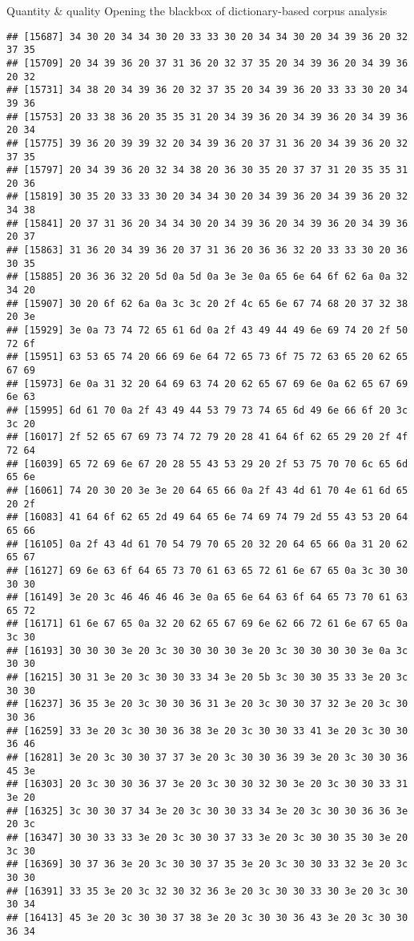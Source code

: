 \documentclass[
  ignorenonframetext,
]{beamer}
\begin{document}
\begin{frame}[fragile]{Quantity \& quality \textbar{} Opening the
blackbox of dictionary-based corpus analysis}
\begin{verbatim}
## [15687] 34 30 20 34 34 30 20 33 33 30 20 34 34 30 20 34 39 36 20 32 37 35
## [15709] 20 34 39 36 20 37 31 36 20 32 37 35 20 34 39 36 20 34 39 36 20 32
## [15731] 34 38 20 34 39 36 20 32 37 35 20 34 39 36 20 33 33 30 20 34 39 36
## [15753] 20 33 38 36 20 35 35 31 20 34 39 36 20 34 39 36 20 34 39 36 20 34
## [15775] 39 36 20 39 39 32 20 34 39 36 20 37 31 36 20 34 39 36 20 32 37 35
## [15797] 20 34 39 36 20 32 34 38 20 36 30 35 20 37 37 31 20 35 35 31 20 36
## [15819] 30 35 20 33 33 30 20 34 34 30 20 34 39 36 20 34 39 36 20 32 34 38
## [15841] 20 37 31 36 20 34 34 30 20 34 39 36 20 34 39 36 20 34 39 36 20 37
## [15863] 31 36 20 34 39 36 20 37 31 36 20 36 36 32 20 33 33 30 20 36 30 35
## [15885] 20 36 36 32 20 5d 0a 5d 0a 3e 3e 0a 65 6e 64 6f 62 6a 0a 32 34 20
## [15907] 30 20 6f 62 6a 0a 3c 3c 20 2f 4c 65 6e 67 74 68 20 37 32 38 20 3e
## [15929] 3e 0a 73 74 72 65 61 6d 0a 2f 43 49 44 49 6e 69 74 20 2f 50 72 6f
## [15951] 63 53 65 74 20 66 69 6e 64 72 65 73 6f 75 72 63 65 20 62 65 67 69
## [15973] 6e 0a 31 32 20 64 69 63 74 20 62 65 67 69 6e 0a 62 65 67 69 6e 63
## [15995] 6d 61 70 0a 2f 43 49 44 53 79 73 74 65 6d 49 6e 66 6f 20 3c 3c 20
## [16017] 2f 52 65 67 69 73 74 72 79 20 28 41 64 6f 62 65 29 20 2f 4f 72 64
## [16039] 65 72 69 6e 67 20 28 55 43 53 29 20 2f 53 75 70 70 6c 65 6d 65 6e
## [16061] 74 20 30 20 3e 3e 20 64 65 66 0a 2f 43 4d 61 70 4e 61 6d 65 20 2f
## [16083] 41 64 6f 62 65 2d 49 64 65 6e 74 69 74 79 2d 55 43 53 20 64 65 66
## [16105] 0a 2f 43 4d 61 70 54 79 70 65 20 32 20 64 65 66 0a 31 20 62 65 67
## [16127] 69 6e 63 6f 64 65 73 70 61 63 65 72 61 6e 67 65 0a 3c 30 30 30 30
## [16149] 3e 20 3c 46 46 46 46 3e 0a 65 6e 64 63 6f 64 65 73 70 61 63 65 72
## [16171] 61 6e 67 65 0a 32 20 62 65 67 69 6e 62 66 72 61 6e 67 65 0a 3c 30
## [16193] 30 30 30 3e 20 3c 30 30 30 30 3e 20 3c 30 30 30 30 3e 0a 3c 30 30
## [16215] 30 31 3e 20 3c 30 30 33 34 3e 20 5b 3c 30 30 35 33 3e 20 3c 30 30
## [16237] 36 35 3e 20 3c 30 30 36 31 3e 20 3c 30 30 37 32 3e 20 3c 30 30 36
## [16259] 33 3e 20 3c 30 30 36 38 3e 20 3c 30 30 33 41 3e 20 3c 30 30 36 46
## [16281] 3e 20 3c 30 30 37 37 3e 20 3c 30 30 36 39 3e 20 3c 30 30 36 45 3e
## [16303] 20 3c 30 30 36 37 3e 20 3c 30 30 32 30 3e 20 3c 30 30 33 31 3e 20
## [16325] 3c 30 30 37 34 3e 20 3c 30 30 33 34 3e 20 3c 30 30 36 36 3e 20 3c
## [16347] 30 30 33 33 3e 20 3c 30 30 37 33 3e 20 3c 30 30 35 30 3e 20 3c 30
## [16369] 30 37 36 3e 20 3c 30 30 37 35 3e 20 3c 30 30 33 32 3e 20 3c 30 30
## [16391] 33 35 3e 20 3c 32 30 32 36 3e 20 3c 30 30 33 30 3e 20 3c 30 30 34
## [16413] 45 3e 20 3c 30 30 37 38 3e 20 3c 30 30 36 43 3e 20 3c 30 30 36 34

\end{verbatim}
\end{frame}
\end{document}
